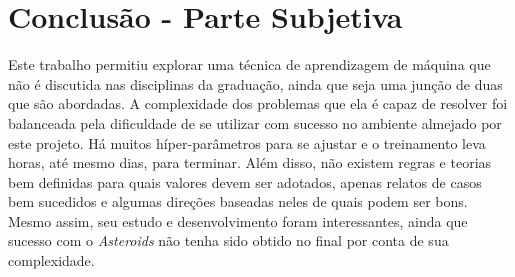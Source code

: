 
\chapter{Conclusão - Parte Subjetiva}
\label{cap:conclusoes}

Este trabalho permitiu explorar uma técnica de aprendizagem de máquina que não é discutida nas disciplinas da graduação, ainda que seja uma junção de duas que são abordadas.
A complexidade dos problemas que ela é capaz de resolver foi balanceada pela dificuldade de se utilizar com sucesso no ambiente almejado por este projeto.
Há muitos híper-parâmetros para se ajustar e o treinamento leva horas, até mesmo dias, para terminar.
Além disso, não existem regras e teorias bem definidas para quais valores devem ser adotados, apenas relatos de casos bem sucedidos e algumas direções baseadas neles de quais podem ser bons.
Mesmo assim, seu estudo e desenvolvimento foram interessantes, ainda que sucesso com o \textit{Asteroids} não tenha sido obtido no final por conta de sua complexidade.





